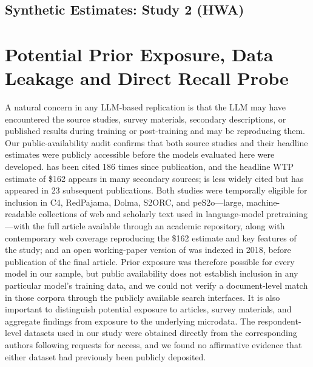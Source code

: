 \documentclass[12pt]{article}
\begin{document}
\newpage
\subsection{Synthetic Estimates: Study 2 (HWA)}\label{app:tables-hwa}






%


\section{Potential Prior Exposure, Data Leakage and Direct Recall Probe}
\label{app:leakage}

A natural concern in any LLM-based replication is that the LLM may have encountered the source studies, survey materials, secondary descriptions,
or published results during training or post-training and may be reproducing them. Our public-availability audit confirms that both source studies and their headline estimates were publicly accessible before the models evaluated here were developed. \textcite{Aldy2012} has been cited 186 times since publication, and the headline WTP estimate of \$162 appears in many secondary sources; \textcite{Giguere2020} is less widely cited but has appeared in 23 subsequent publications. Both studies were temporally eligible for inclusion in C4, RedPajama, Dolma, S2ORC, and peS2o---large,
machine-readable collections of web and scholarly text used in language-model pretraining---with the full \textcite{Aldy2012} article available through an academic repository, along with contemporary web coverage reproducing the \$162 estimate and key features of the study; and an open working-paper version of \textcite{Giguere2020} was indexed in 2018, before publication of the final article. Prior exposure was therefore possible for every model in our sample, but public availability does not establish inclusion in any particular model's training data, and we could not verify a document-level match in those corpora through the publicly available search interfaces. It is also important to distinguish potential exposure to articles, survey materials, and aggregate findings from exposure to the underlying microdata. The respondent-level datasets used in our study were obtained directly from the corresponding authors following requests for access, and we found no affirmative evidence that either dataset had previously been publicly deposited.
\end{document}

